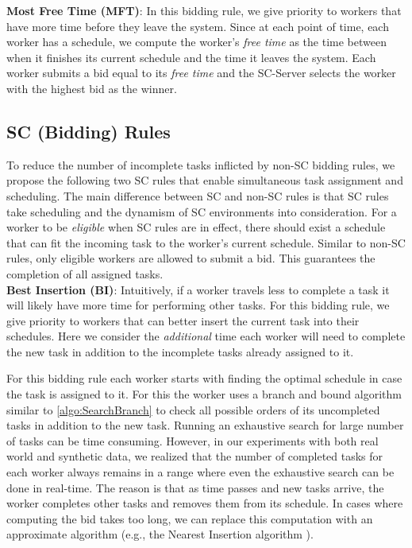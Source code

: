 \noindent\textbf{Most Free Time (MFT)}:
In this bidding rule, we give priority to workers that have more time before they leave the system. Since at each point of time, each worker has a schedule, we compute the worker's \emph{free time} as the time between when it finishes its current schedule and the time it leaves the system. Each worker submits a bid equal to its \emph{free time} and the SC-Server selects the worker with the highest bid as the winner.

\subsection{SC (Bidding) Rules }

To reduce the number of incomplete tasks inflicted by non-SC bidding rules, we propose the following two SC rules that enable simultaneous task assignment and scheduling. The main difference between SC and non-SC rules is that SC rules take scheduling and the dynamism of SC environments into consideration. For a worker to be \emph{eligible} when SC rules are in effect, there should exist a schedule that can fit the incoming task to the worker's current schedule. Similar to non-SC rules, only eligible workers are allowed to submit a bid. This guarantees the completion of all assigned tasks.\\

\noindent \textbf{Best Insertion (BI)}: 
Intuitively, if a worker travels less to complete a task it will likely have more time for performing other tasks. For this bidding rule, we give priority to workers that can better insert the current task into their schedules. Here we consider the \textit{additional} time each worker will need to complete the new task in addition to the incomplete tasks already assigned to it.

For this bidding rule each worker starts with finding the optimal schedule in case the task is assigned to it. For this the worker uses a branch and bound algorithm similar to \cref{algo:SearchBranch} to check all possible orders of its uncompleted tasks in addition to the new task. Running an exhaustive search for large number of tasks can be time consuming. However, in our experiments with both real world and synthetic data, we realized that the number of completed tasks for each worker always remains in a range where even the exhaustive search can be done in real-time. The reason is that as time passes and new tasks arrive, the worker completes other tasks and removes them from its schedule. In cases where computing the bid takes too long, we can replace this computation with an approximate algorithm (e.g., the Nearest Insertion algorithm \cite{Rosenkrantz74}).

